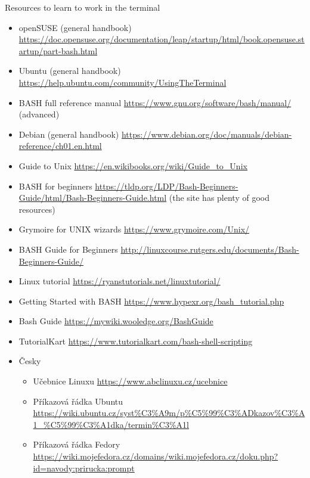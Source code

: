\documentclass[compress, ucs, xelatex, 11pt, xcolor=svgnames, aspectratio=169,
	hyperref={
		bookmarks=true,
		unicode=true,
		colorlinks=true,
		pdftitle={Linux, command line and MetaCentrum},
		plainpages=false,
		pdfauthor={Vojtech Zeisek},
		pdfsubject={Course about use of Linux command line, writing shell scripts and using MetaCentrum of CESNET},
		pdfcreator={XeLaTeX},
		pdfkeywords={Linux, GNU, BASH, shell, command line, MetaCentrum},
		linkcolor=DarkRed, %
		anchorcolor=DarkBlue, %
		citecolor=Indigo, %
		filecolor=NavyBlue, %
		menucolor=DarkMagenta, %
		urlcolor=DarkBlue, %
		pdftex},
	url={hyphens, lowtilde} %
	]{beamer}
\begin{document}
\begin{frame}[allowframebreaks]{Resources to learn to work in the terminal}
	\begin{itemize}
		\item openSUSE (general handbook) \url{https://doc.opensuse.org/documentation/leap/startup/html/book.opensuse.startup/part-bash.html}
		\item Ubuntu (general handbook) \url{https://help.ubuntu.com/community/UsingTheTerminal}
		\item BASH full reference manual \url{https://www.gnu.org/software/bash/manual/} (advanced)
		\item Debian (general handbook) \url{https://www.debian.org/doc/manuals/debian-reference/ch01.en.html}
		\item Guide to Unix \url{https://en.wikibooks.org/wiki/Guide_to_Unix}
		\item BASH for beginners \url{https://tldp.org/LDP/Bash-Beginners-Guide/html/Bash-Beginners-Guide.html} (the site has plenty of good resources)
		\item Grymoire for UNIX wizards \url{https://www.grymoire.com/Unix/}
		\item BASH Guide for Beginners \url{http://linuxcourse.rutgers.edu/documents/Bash-Beginners-Guide/}
		\item Linux tutorial \url{https://ryanstutorials.net/linuxtutorial/}
		\item Getting Started with BASH \url{https://www.hypexr.org/bash_tutorial.php}
		\item Bash Guide \url{https://mywiki.wooledge.org/BashGuide}
		\item TutorialKart \url{https://www.tutorialkart.com/bash-shell-scripting}
		\item Česky
		\begin{itemize}
			\item Učebnice Linuxu \url{https://www.abclinuxu.cz/ucebnice}
			\item Příkazová řádka Ubuntu \url{https://wiki.ubuntu.cz/syst\%C3\%A9m/p\%C5\%99\%C3\%ADkazov\%C3\%A1_\%C5\%99\%C3\%A1dka/termin\%C3\%A1l}
			\item Příkazová řádka Fedory \url{https://wiki.mojefedora.cz/domains/wiki.mojefedora.cz/doku.php?id=navody:prirucka:prompt}
		\end{itemize}
	\end{itemize}
\end{frame}
\end{document}

